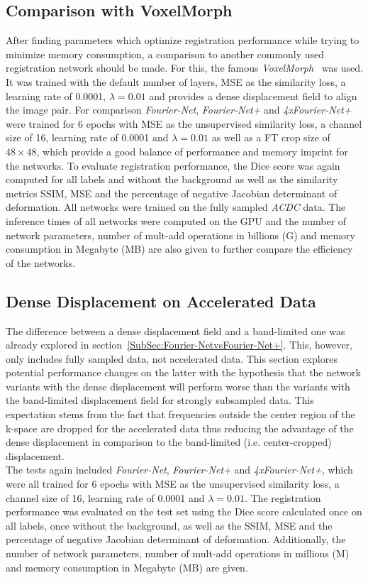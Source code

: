 \documentclass[english,version-2022-01]{uzl-thesis} %
\begin{document}
\subsection{Comparison with VoxelMorph} \label{SubSec:ComparisonVoxelMorph}
After finding parameters which optimize registration performance while trying to minimize memory consumption, a comparison to another commonly used registration network should be made. For this, the famous \emph{VoxelMorph}~\cite{Voxelmorph} was used. It was trained with the default number of layers, MSE as the similarity loss, a learning rate of 0.0001, $\lambda=0.01$ and provides a dense displacement field to align the image pair. For comparison \emph{Fourier-Net}, \emph{Fourier-Net+} and \emph{4xFourier-Net+} were trained for 6 epochs with MSE as the unsupervised similarity loss, a channel size of 16, learning rate of 0.0001 and $\lambda=0.01$ as well as a FT crop size of $48 \times 48$, which provide a good balance of performance and memory imprint for the networks. To evaluate registration performance, the Dice score was again computed for all labels and without the background as well as the similarity metrics SSIM, MSE and the percentage of negative Jacobian determinant of deformation. All networks were trained on the fully sampled \emph{ACDC} data. The inference times of all networks were computed on the GPU and the number of network parameters, number of mult-add operations in billions (G) and memory consumption in Megabyte (MB) are also given to further compare the efficiency of the networks. 


\subsection{Dense Displacement on Accelerated Data} \label{SubSec:DenseDisplacementAcc}
The difference between a dense displacement field and a band-limited one was already explored in section~\ref{SubSec:Fourier-NetvsFourier-Net+}. This, however, only includes fully sampled data, not accelerated data. This section explores potential performance changes on the latter with the hypothesis that the network variants with the dense displacement will perform worse than the variants with the band-limited displacement field for strongly subsampled data. This expectation stems from the fact that frequencies outside the center region of the k-space are dropped for the accelerated data thus reducing the advantage of the dense displacement in comparison to the band-limited (i.e. center-cropped) displacement. \\
The tests again included \emph{Fourier-Net}, \emph{Fourier-Net+} and \emph{4xFourier-Net+}, which were all trained for 6 epochs with MSE as the unsupervised similarity loss, a channel size of 16, learning rate of 0.0001 and $\lambda=0.01$. The registration performance was evaluated on the test set using the Dice score calculated once on all labels, once without the background, as well as the SSIM, MSE and the percentage of negative Jacobian determinant of deformation. Additionally, the number of network parameters, number of mult-add operations in millions (M) and memory consumption in Megabyte (MB) are given.
\end{document}
